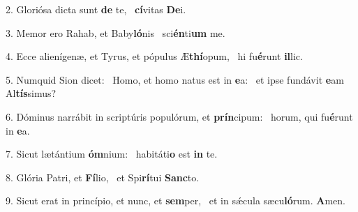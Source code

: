 2. Gloriósa dicta sunt \textbf{de} te, \ast\  \textbf{cí}vitas \textbf{De}i.\

3. Memor ero Rahab, et Baby\textbf{ló}nis \ast\  sci\textbf{én}ti\textbf{um} me.\

4. Ecce alienígenæ, et Tyrus, et pópulus Æ\textbf{thí}opum, \ast\  hi fu\textbf{é}runt \textbf{il}lic.\

5. Numquid Sion dicet: \dag\  Homo, et homo natus est in \textbf{e}a: \ast\  et ipse fundávit \textbf{e}am Al\textbf{tís}simus?\

6. Dóminus narrábit in scriptúris populórum, et \textbf{prín}cipum: \ast\  horum, qui fu\textbf{é}runt in \textbf{e}a.\

7. Sicut lætántium \textbf{óm}nium: \ast\  habitáti\textbf{o} est \textbf{in} te.\

8. Glória Patri, et \textbf{Fí}lio, \ast\  et Spi\textbf{rí}tui \textbf{Sanc}to.\

9. Sicut erat in princípio, et nunc, et \textbf{sem}per, \ast\  et in sǽcula sæcu\textbf{ló}rum. \textbf{A}men.\

